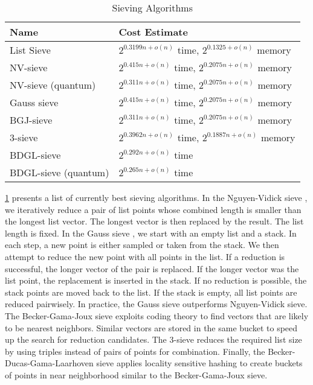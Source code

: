 \begin{table}[h]
  \centering
  \begin{tabular}{ll}
    \toprule
    Name & Cost Estimate \\\hline
    List Sieve \cite{MV10} & $2^{0.3199n + o(n)}$ time, $2^{0.1325 + o(n)}$ memory\\
    NV-sieve \cite{NV08, ADHKPS19} & $2^{0.415n + o(n)}$ time, $2^{0.2075n + o(n)}$ memory\\
    NV-sieve (quantum) \cite{NV08, ADHKPS19} & $2^{0.311n + o(n)}$ time, $2^{0.2075n + o(n)}$ memory\\
    Gauss sieve \cite{MV10, HK17} & $2^{0.415n + o(n)}$ time, $2^{0.2075n + o(n)}$ memory\\
    BGJ-sieve \cite{BGJ15} & $2^{0.311n + o(n)}$ time, $2^{0.2075n + o(n)}$ memory\\
    3-sieve \cite{BLS16, HK17} & $2^{0.3962n + o(n)}$ time, $2^{0.1887n + o(n)}$ memory\\
    BDGL-sieve \cite{BDGL16} & $2^{0.292n + o(n)}$ time\\
    BDGL-sieve (quantum) \cite{BDGL16} & $2^{0.265n + o(n)}$ time \\
    \bottomrule
  \end{tabular}
  \caption{Sieving Algorithms} %
  \label{tab:sieving}
\end{table}

\cref{tab:sieving} presents a list of currently best sieving algorithms. 
In the Nguyen-Vidick sieve \cite{NV08}, we iteratively reduce a pair of list points whose combined length is smaller than the longest list vector. The longest vector is then replaced by the result. The list length is fixed. 
In the Gauss sieve \cite{MV10}, we start with an empty list and a stack. In each step, a new point is either sampled or taken from the stack. We then attempt to reduce the new point with all points in the list. If a reduction is successful, the longer vector of the pair is replaced. If the longer vector was the list point, the replacement is inserted in the stack. If no reduction is possible, the stack points are moved back to the list. If the stack is empty, all list points are reduced pairwisely. In practice, the Gauss sieve outperforms Nguyen-Vidick sieve. 
The Becker-Gama-Joux sieve \cite{BGJ15} exploits coding theory to find vectors that are likely to be nearest neighbors. Similar vectors are stored in the same bucket to speed up the search for reduction candidates.
The 3-sieve \cite{BLS16, HK17} reduces the required list size by using triples instead of pairs of points for combination.
Finally, the Becker-Ducas-Gama-Laarhoven sieve \cite{BDGL16} applies locality sensitive hashing to create buckets of points in near neighborhood similar to the Becker-Gama-Joux sieve. %

